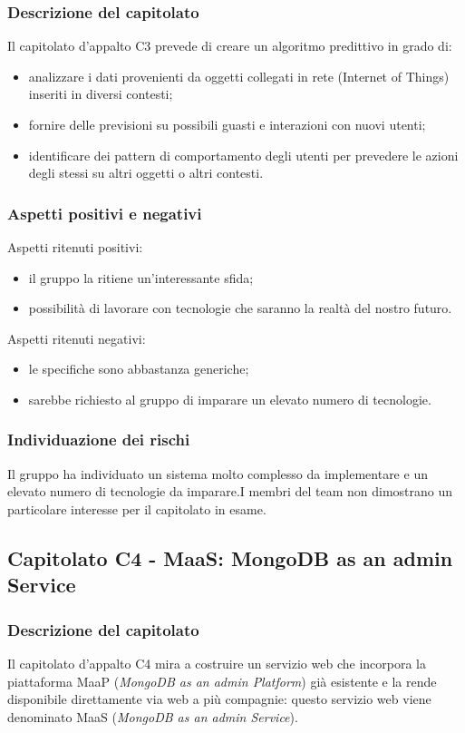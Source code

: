 \documentclass[../StudioDiFattibilita.tex]{subfiles}
\begin{document}
		\subsubsection{Descrizione del capitolato}
		Il capitolato d'appalto C3 prevede di creare un algoritmo predittivo in grado di:
		\begin{itemize}
		\item analizzare i dati provenienti da oggetti collegati in rete (Internet of Things) inseriti in diversi contesti;
	    \item fornire delle previsioni su possibili guasti e interazioni con nuovi utenti;
		\item identificare dei pattern di comportamento degli utenti per prevedere le azioni degli stessi su altri oggetti o altri contesti.
	    \end{itemize}
		\subsubsection{Aspetti positivi e negativi}
		Aspetti ritenuti positivi:
			\begin{itemize}
				\item il gruppo la ritiene un'interessante sfida;
				\item possibilità di lavorare con tecnologie che saranno la realtà del nostro futuro.
			\end{itemize}
		Aspetti ritenuti negativi:
			\begin{itemize}
				\item le specifiche sono abbastanza generiche;
				\item sarebbe richiesto al gruppo di imparare un elevato numero di tecnologie.
			\end{itemize}
		\subsubsection{Individuazione dei rischi}
		Il gruppo ha individuato un sistema molto complesso da implementare e un elevato numero di tecnologie da imparare.I membri del team non dimostrano un particolare interesse per il capitolato in esame.
	\subsection{Capitolato C4 - MaaS: MongoDB as an admin Service}
		\subsubsection{Descrizione del capitolato}
		Il capitolato d'appalto C4 mira a costruire un servizio web che incorpora la piattaforma MaaP (\textit{MongoDB as an admin Platform}) già esistente e la rende disponibile direttamente via web a più compagnie: questo servizio web viene denominato MaaS (\textit{MongoDB as an admin Service}).
\end{document}
